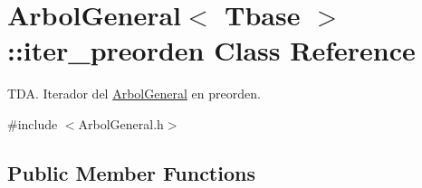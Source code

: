 \hypertarget{classArbolGeneral_1_1iter__preorden}{\section{Arbol\-General$<$ Tbase $>$\-:\-:iter\-\_\-preorden Class Reference}
\label{classArbolGeneral_1_1iter__preorden}
}


T\-D\-A. Iterador del \hyperlink{classArbolGeneral}{Arbol\-General} en preorden.  




{\ttfamily \#include $<$Arbol\-General.\-h$>$}

\subsection*{Public Member Functions}
